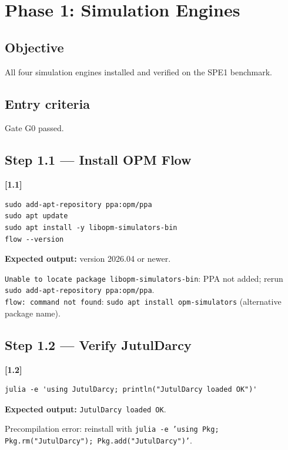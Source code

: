\documentclass[10pt,a4paper]{article}
\newcommand{\stepID}[1]{\textsf{\textbf{[#1]}}}
\newcommand{\cmd}[1]{\texttt{#1}}
\begin{document}
\section{Phase 1: Simulation Engines}
\label{sec:phase1}

\subsection{Objective}
All four simulation engines installed and verified on the SPE1 benchmark.

\subsection{Entry criteria}
Gate G0 passed.

\subsection{Step 1.1 --- Install OPM Flow}

\stepID{1.1}
\begin{lstlisting}[style=sh]
sudo add-apt-repository ppa:opm/ppa
sudo apt update
sudo apt install -y libopm-simulators-bin
flow --version
\end{lstlisting}

\textbf{Expected output:} version 2026.04 or newer.

\begin{failure}
\texttt{Unable to locate package libopm-simulators-bin}: PPA not added; rerun \cmd{sudo add-apt-repository ppa:opm/ppa}.\\
\texttt{flow: command not found}: \cmd{sudo apt install opm-simulators} (alternative package name).
\end{failure}

\subsection{Step 1.2 --- Verify JutulDarcy}

\stepID{1.2}
\begin{lstlisting}[style=jl]
julia -e 'using JutulDarcy; println("JutulDarcy loaded OK")'
\end{lstlisting}

\textbf{Expected output:} \cmd{JutulDarcy loaded OK}.

\begin{failure}
Precompilation error: reinstall with \cmd{julia -e 'using Pkg; Pkg.rm("JutulDarcy"); Pkg.add("JutulDarcy")'}.
\end{failure}
\end{document}
